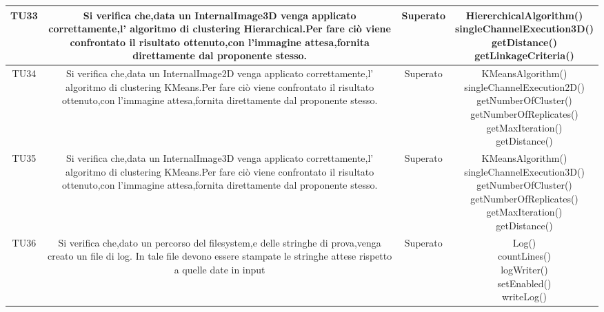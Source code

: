 \begin{center}
\begin{longtable}{|c|c|c|c|}
\hline
TU33 & \parbox[t]{\larghezza}{ Si verifica che,data un InternalImage3D venga applicato correttamente,l' algoritmo di clustering Hierarchical.Per fare ciò viene confrontato il risultato ottenuto,con l'immagine attesa,fornita direttamente dal proponente stesso. } & Superato & \parbox[t]{\dimTipo} { HiererchicalAlgorithm() \\ singleChannelExecution3D() \\ getDistance() \\ getLinkageCriteria() \\ } \\
\hline
TU34 & \parbox[t]{\larghezza}{ Si verifica che,data un InternalImage2D venga applicato correttamente,l' algoritmo di clustering KMeans.Per fare ciò viene confrontato il risultato ottenuto,con l'immagine attesa,fornita direttamente dal proponente stesso. } & Superato & \parbox[t]{\dimTipo} { KMeansAlgorithm() \\ singleChannelExecution2D() \\ getNumberOfCluster() \\ getNumberOfReplicates() \\ getMaxIteration() \\ getDistance() \\ } \\
\hline
TU35 & \parbox[t]{\larghezza}{ Si verifica che,data un InternalImage3D venga applicato correttamente,l' algoritmo di clustering KMeans.Per fare ciò viene confrontato il risultato ottenuto,con l'immagine attesa,fornita direttamente dal proponente stesso. } & Superato & \parbox[t]{\dimTipo} { KMeansAlgorithm() \\ singleChannelExecution3D() \\ getNumberOfCluster() \\ getNumberOfReplicates() \\ getMaxIteration() \\ getDistance() \\ } \\
\hline
TU36 & \parbox[t]{\larghezza}{ Si verifica che,dato un percorso del filesystem,e delle stringhe di prova,venga creato un file di log.
In tale file devono essere stampate le stringhe attese rispetto a quelle date in input  } & Superato & \parbox[t]{\dimTipo} { Log() \\ countLines() \\ logWriter() \\ setEnabled() \\ writeLog() \\ } \\

\end{longtable}
\end{center}
